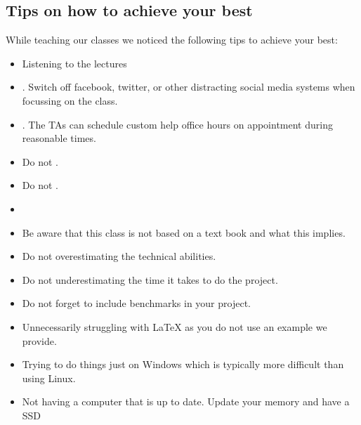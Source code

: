 
\subsection{Tips on how to achieve your best}
\label{\detokenize{i524/index:tips-on-how-to-achieve-your-best}}\label{\detokenize{i524/index:index-7}}
While teaching our classes we noticed the following tips to achieve
your best:
\begin{itemize}
\item {} 
Listening to the lectures

\item {} 
. Switch off
facebook, twitter, or other distracting social media systems when
focussing on the class.

\item {} 
. The TAs can schedule custom help office hours on
appointment during reasonable times.

\item {} 
Do not .

\item {} 
Do not .

\item {} 

\item {} 
Be aware that this class is not based on a text book and what this
implies.

\item {} 
Do not overestimating the technical abilities.

\item {} 
Do not underestimating the time it takes to do the project.

\item {} 
Do not forget to include benchmarks in your project.

\item {} 
Unnecessarily struggling with LaTeX as you do not use an example we
provide.

\item {} 
Trying to do things just on Windows which is typically more difficult
than using Linux.

\item {} 
Not having a computer that is up to date. Update your memory and
have a SSD


\end{itemize}
